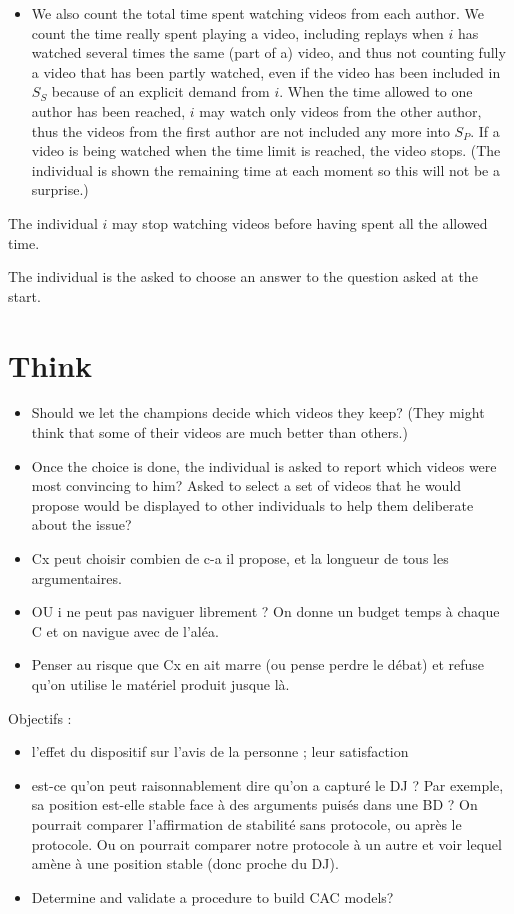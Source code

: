 \documentclass[version=3.21, pagesize, twoside=off, bibliography=totoc, DIV=calc, fontsize=12pt, a4paper]{scrartcl}
\begin{document}
\begin{itemize}
	\item We also count the total time spent watching videos from each author. We count the time really spent playing a video, including replays when $i$ has watched several times the same (part of a) video, and thus not counting fully a video that has been partly watched, even if the video has been included in $S_S$ because of an explicit demand from $i$. When the time allowed to one author has been reached, $i$ may watch only videos from the other author, thus the videos from the first author are not included any more into $S_P$. If a video is being watched when the time limit is reached, the video stops. (The individual is shown the remaining time at each moment so this will not be a surprise.)
\end{itemize}
The individual $i$ may stop watching videos before having spent all the allowed time.

The individual is the asked to choose an answer to the question asked at the start.

\section{Think}
\begin{itemize}
	\item Should we let the champions decide which videos they keep? (They might think that some of their videos are much better than others.)
	\item Once the choice is done, the individual is asked to report which videos were most convincing to him? Asked to select a set of videos that he would propose would be displayed to other individuals to help them deliberate about the issue?
	\item Cx peut choisir combien de c-a il propose, et la longueur de tous les argumentaires.
	\item OU i ne peut pas naviguer librement ? On donne un budget temps à chaque C et on navigue avec de l’aléa.
	\item Penser au risque que Cx en ait marre (ou pense perdre le débat) et refuse qu’on utilise le matériel produit jusque là.
\end{itemize}

Objectifs : 
\begin{itemize}
	\item l’effet du dispositif sur l’avis de la personne ; leur satisfaction
	\item est-ce qu’on peut raisonnablement dire qu’on a capturé le DJ ? Par exemple, sa position est-elle stable face à des arguments puisés dans une BD ? On pourrait comparer l’affirmation de stabilité sans protocole, ou après le protocole. Ou on pourrait comparer notre protocole à un autre et voir lequel amène à une position stable (donc proche du DJ).
	\item Determine and validate a procedure to build CAC models?
\end{itemize}
\end{document}
